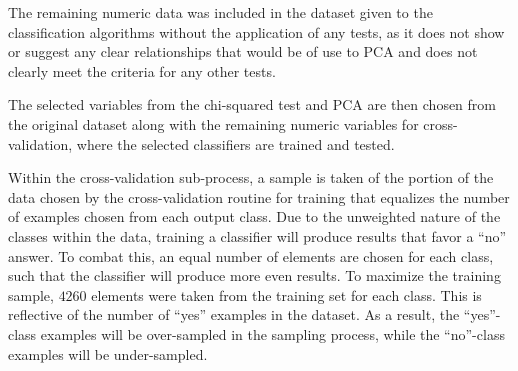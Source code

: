 \documentclass[prodmode]{acmsmall} %
\begin{document}
The remaining numeric data was included in the dataset given to the
classification algorithms without the application of any tests, as it does not
show or suggest any clear relationships that would be of use to PCA and does not
clearly meet the criteria for any other tests.

The selected variables from the chi-squared test and PCA are then chosen from
the original dataset along with the remaining numeric variables for
cross-validation, where the selected classifiers are trained and tested.

\begin{table}[!t]
\end{table}

Within the cross-validation sub-process, a sample is taken of the portion of the
data chosen by the cross-validation routine for training that equalizes the
number of examples chosen from each output class. Due to the unweighted nature
of the classes within the data, training a classifier will produce results that
favor a ``no'' answer. To combat this, an equal number of elements are chosen
for each class, such that the classifier will produce more even results. To
maximize the training sample, $4260$ elements were taken from the training set
for each class. This is reflective of the number of ``yes'' examples in the
dataset. As a result, the ``yes''-class examples will be over-sampled in the sampling
process, while the ``no''-class examples will be under-sampled.
\end{document}
